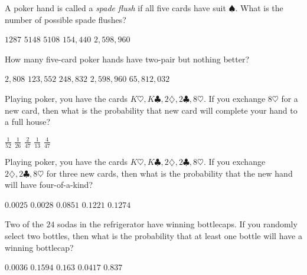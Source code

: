 \documentclass[answers,12pt]{exam}
\begin{document}
\begin{questions}
\question A poker hand is called a {\em spade flush}
if all five cards have suit $\spadesuit$. What is
the number of possible spade flushes?\\
\begin{oneparchoices}
\correctchoice $1287$
\choice $5148$ %
\choice $5108$ %
\choice $154,440$ %
\choice $2,598,960$ %
\end{oneparchoices}

\question 
How many five-card poker hands have two-pair but nothing better?\\
\begin{oneparchoices}
\choice $2,808$ %
\correctchoice $123,552$
\choice $248,832$ %
\choice $2,598,960$ %
\choice $65,812,032$ %
\end{oneparchoices}

\question Playing poker, you have the cards
$K\heartsuit,K\clubsuit,2\diamondsuit,2\clubsuit,8\heartsuit$.
If you exchange $8\heartsuit$ for a new card,
then what is the probability that new card
will complete your hand to a full house?\\
\begin{oneparchoices}
\choice $\frac{1}{52}$
\choice $\frac{1}{26}$ %
\choice $\frac{2}{47}$ %
\choice $\frac{1}{13}$ %
\correctchoice $\frac{4}{47}$
\end{oneparchoices}

\question Playing poker, you have the cards
$K\heartsuit,K\clubsuit,2\diamondsuit,2\clubsuit,8\heartsuit$.
If you exchange $2\diamondsuit,2\clubsuit,8\heartsuit$ for three
new cards, then what is the probability that the new hand
will have four-of-a-kind?\\
\begin{oneparchoices}
\choice $0.0025$ %
\correctchoice $0.0028$
\choice $0.0851$ %
\choice $0.1221$ %
\choice $0.1274$ %
\end{oneparchoices}

\question Two of the $24$ sodas in the refrigerator
have winning bottlecaps. If you randomly select two
bottles, then what is the probability that at least one bottle
will have a winning bottlecap?\\
\begin{oneparchoices}
\choice $0.0036$ %
\choice $0.1594$ %
\correctchoice $0.163$
\choice $0.0417$ %
\choice $0.837$ %
\end{oneparchoices}

\end{questions}
\end{document}
